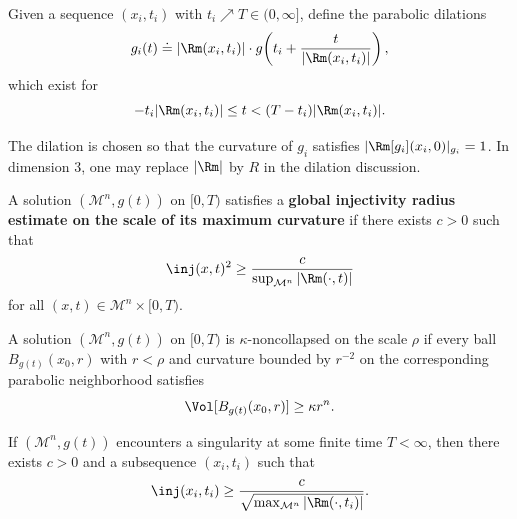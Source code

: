 \begin{definition}
\label{ch08-def-parabolic-dilations}

Given a sequence \((x_i,t_i)\) with \(t_i\nearrow T\in(0,\infty]\), define the parabolic dilations
\[
g_i(t)\doteq |\Rm(x_i,t_i)|\cdot g\!\left(t_i+\frac{t}{|\Rm(x_i,t_i)|}\right),
\]
which exist for
\[
-t_i|\Rm(x_i,t_i)|\le t < (T-t_i)|\Rm(x_i,t_i)|.
\]
\end{definition}

\begin{remark}
\label{ch08-rem-dilation-normalization}

The dilation is chosen so that the curvature of \(g_i\) satisfies \(|\Rm[g_i](x_i,0)|_{g_i}=1\). In dimension \(3\), one may replace \(|\Rm|\) by \(R\) in the dilation discussion.
\end{remark}

\begin{definition}
\label{ch08-def-global-injectivity-radius-estimate}

A solution \((\mathcal M^n,g(t))\) on \([0,T)\) satisfies a \textbf{global injectivity radius estimate on the scale of its maximum curvature} if there exists \(c>0\) such that
\[
\inj(x,t)^2\ge \frac{c}{\sup_{\mathcal M^n}|\Rm(\cdot,t)|}
\]
for all \((x,t)\in\mathcal M^n\times[0,T)\).
\end{definition}

\begin{definition}
\label{ch08-def-kappa-noncollapsed}

A solution \((\mathcal M^n,g(t))\) on \([0,T)\) is \(\kappa\)-noncollapsed on the scale \(\rho\) if every ball \(B_{g(t)}(x_0,r)\) with \(r<\rho\) and curvature bounded by \(r^{-2}\) on the corresponding parabolic neighborhood satisfies
\[
\Vol[B_{g(t)}(x_0,r)]\ge \kappa r^n.
\]
\end{definition}

\begin{theorem}
\label{ch08-thm-perelman-injectivity-estimate}

If \((\mathcal M^n,g(t))\) encounters a singularity at some finite time \(T<\infty\), then there exists \(c>0\) and a subsequence \((x_i,t_i)\) such that
\[
\inj(x_i,t_i)\ge \frac{c}{\sqrt{\max_{\mathcal M^n}|\Rm(\cdot,t_i)|}}.
\]
\end{theorem}

